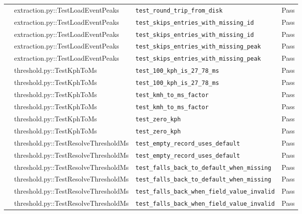 \documentclass[11pt,a4paper]{article}
\begin{document}
\begin{center}
\begin{longtable}{p{2.2cm} p{4.5cm} p{6.5cm} p{1.4cm}}
     & extraction.py::TestLoadEventPeaks & \texttt{test\_round\_trip\_from\_disk} & \textcolor{green!60!black}{Pass} \\
     & extraction.py::TestLoadEventPeaks & \texttt{test\_skips\_entries\_with\_missing\_id} & \textcolor{green!60!black}{Pass} \\
     & extraction.py::TestLoadEventPeaks & \texttt{test\_skips\_entries\_with\_missing\_id} & \textcolor{green!60!black}{Pass} \\
     & extraction.py::TestLoadEventPeaks & \texttt{test\_skips\_entries\_with\_missing\_peak} & \textcolor{green!60!black}{Pass} \\
     & extraction.py::TestLoadEventPeaks & \texttt{test\_skips\_entries\_with\_missing\_peak} & \textcolor{green!60!black}{Pass} \\
     & threshold.py::TestKphToMs & \texttt{test\_100\_kph\_is\_27\_78\_ms} & \textcolor{green!60!black}{Pass} \\
     & threshold.py::TestKphToMs & \texttt{test\_100\_kph\_is\_27\_78\_ms} & \textcolor{green!60!black}{Pass} \\
     & threshold.py::TestKphToMs & \texttt{test\_kmh\_to\_ms\_factor} & \textcolor{green!60!black}{Pass} \\
     & threshold.py::TestKphToMs & \texttt{test\_kmh\_to\_ms\_factor} & \textcolor{green!60!black}{Pass} \\
     & threshold.py::TestKphToMs & \texttt{test\_zero\_kph} & \textcolor{green!60!black}{Pass} \\
     & threshold.py::TestKphToMs & \texttt{test\_zero\_kph} & \textcolor{green!60!black}{Pass} \\
     & threshold.py::TestResolveThresholdMs & \texttt{test\_empty\_record\_uses\_default} & \textcolor{green!60!black}{Pass} \\
     & threshold.py::TestResolveThresholdMs & \texttt{test\_empty\_record\_uses\_default} & \textcolor{green!60!black}{Pass} \\
     & threshold.py::TestResolveThresholdMs & \texttt{test\_falls\_back\_to\_default\_when\_missing} & \textcolor{green!60!black}{Pass} \\
     & threshold.py::TestResolveThresholdMs & \texttt{test\_falls\_back\_to\_default\_when\_missing} & \textcolor{green!60!black}{Pass} \\
     & threshold.py::TestResolveThresholdMs & \texttt{test\_falls\_back\_when\_field\_value\_invalid} & \textcolor{green!60!black}{Pass} \\
     & threshold.py::TestResolveThresholdMs & \texttt{test\_falls\_back\_when\_field\_value\_invalid} & \textcolor{green!60!black}{Pass} \\

\end{longtable}
\end{center}
\end{document}
